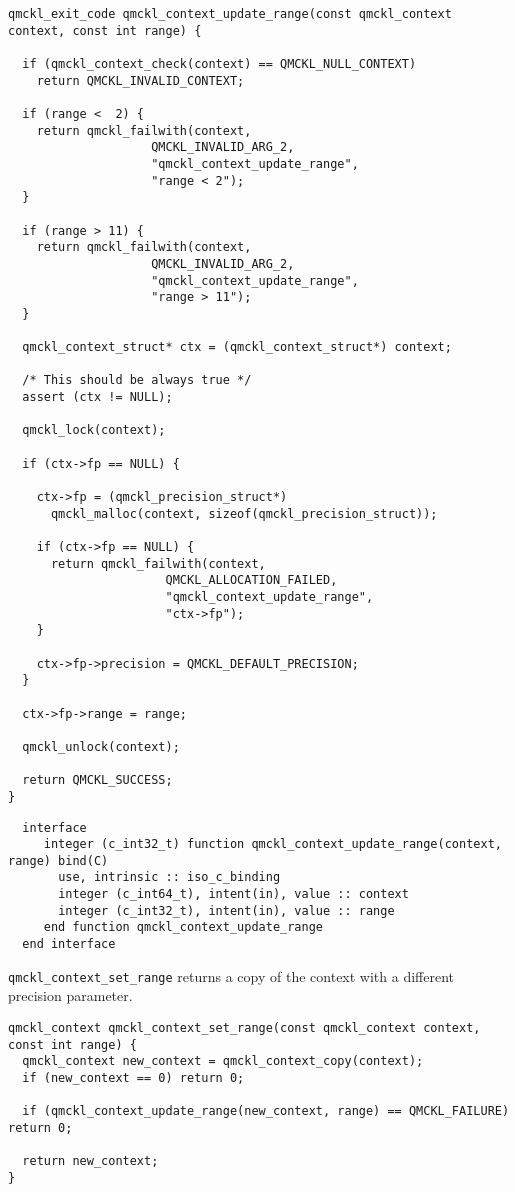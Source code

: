 \begin{verbatim}
qmckl_exit_code qmckl_context_update_range(const qmckl_context context, const int range) {

  if (qmckl_context_check(context) == QMCKL_NULL_CONTEXT)
    return QMCKL_INVALID_CONTEXT;

  if (range <  2) {
    return qmckl_failwith(context,
                    QMCKL_INVALID_ARG_2,
                    "qmckl_context_update_range",
                    "range < 2");
  }

  if (range > 11) {
    return qmckl_failwith(context,
                    QMCKL_INVALID_ARG_2,
                    "qmckl_context_update_range",
                    "range > 11");
  }

  qmckl_context_struct* ctx = (qmckl_context_struct*) context;

  /* This should be always true */
  assert (ctx != NULL);

  qmckl_lock(context);

  if (ctx->fp == NULL) {

    ctx->fp = (qmckl_precision_struct*)
      qmckl_malloc(context, sizeof(qmckl_precision_struct));

    if (ctx->fp == NULL) {
      return qmckl_failwith(context,
                      QMCKL_ALLOCATION_FAILED,
                      "qmckl_context_update_range",
                      "ctx->fp");
    }

    ctx->fp->precision = QMCKL_DEFAULT_PRECISION;
  }

  ctx->fp->range = range;

  qmckl_unlock(context);

  return QMCKL_SUCCESS;
}
\end{verbatim}

\begin{verbatim}
  interface
     integer (c_int32_t) function qmckl_context_update_range(context, range) bind(C)
       use, intrinsic :: iso_c_binding
       integer (c_int64_t), intent(in), value :: context
       integer (c_int32_t), intent(in), value :: range
     end function qmckl_context_update_range
  end interface
\end{verbatim}

\texttt{qmckl\_context\_set\_range} returns a copy of the context with a different precision parameter.

\begin{verbatim}
qmckl_context qmckl_context_set_range(const qmckl_context context, const int range) {
  qmckl_context new_context = qmckl_context_copy(context);
  if (new_context == 0) return 0;

  if (qmckl_context_update_range(new_context, range) == QMCKL_FAILURE) return 0;

  return new_context;
}
\end{verbatim}

